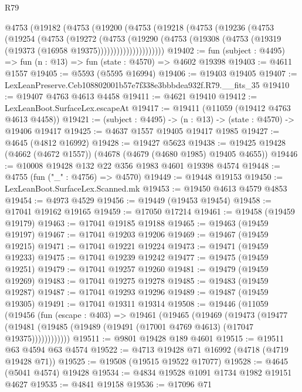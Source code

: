 \begin{lexlean}{R79}
\begin{coremodule}
      @4753
        (@19182
          (@4753
            (@19200
              (@4753
                (@19218
                  (@4753
                    (@19236
                      (@4753
                        (@19254
                          (@4753
                            (@19272
                              (@4753
                                (@19290
                                  (@4753
                                    (@19308
                                      (@4753 (@19319 (@19373 (@16958 @19375)))))))))))))))))))))
@19402 := fun (subject : @4495) => fun (n : @13) => fun (state : @4570) => @4602 @19398
@19403 := @4611 @1557
@19405 := @5593 (@5595 @16994)
@19406 := @19403 @19405
@19407 := LexLeanPreserve.Ceb108802001b57e7f338e3bbbdea932f.R79.__fits_35
@19410 := @19407 @4763 @4613 @4458
@19411 := @4621 @19410
@19412 := LexLeanBoot.SurfaceLex.escapeAt
@19417 := @19411 (@11059 (@19412 @4763 @4613 @4458))
@19421 := (subject : @4495) -> (n : @13) -> (state : @4570) -> @19406 @19417
@19425 := @4637 @1557 @19405 @19417 @1985
@19427 := @4645 (@4812 @16992)
@19428 := @19427 @5623
@19438 := @19425 @19428 (@4662 (@4672 @1557)) (@4678 (@4679 (@4680 @1985) @19405 @4655))
@19446 := @10008 @19428 @132 @22 @356 @1983 @4601 @19398 @4574
@19448 := @4755 (fun ("_" : @4756) => @4570)
@19449 := @19448 @19153
@19450 := LexLeanBoot.SurfaceLex.Scanned.mk
@19453 := @19450 @4613 @4579 @4853
@19454 := @4973 @4529
@19456 := @19449 (@19453 @19454)
@19458 := @17041 @19162 @19165
@19459 := @17050 @17214
@19461 := @19458 (@19459 @19179)
@19463 := @17041 @19185 @19188
@19465 := @19463 (@19459 @19197)
@19467 := @17041 @19203 @19206
@19469 := @19467 (@19459 @19215)
@19471 := @17041 @19221 @19224
@19473 := @19471 (@19459 @19233)
@19475 := @17041 @19239 @19242
@19477 := @19475 (@19459 @19251)
@19479 := @17041 @19257 @19260
@19481 := @19479 (@19459 @19269)
@19483 := @17041 @19275 @19278
@19485 := @19483 (@19459 @19287)
@19487 := @17041 @19293 @19296
@19489 := @19487 (@19459 @19305)
@19491 := @17041 @19311 @19314
@19508 := @19446
    (@11059
      (@19456
        (fun (escape : @403) =>
        @19461
          (@19465
            (@19469
              (@19473
                (@19477
                  (@19481 (@19485 (@19489 (@19491 (@17001 @4769 @4613) (@17047 @19375))))))))))))
@19511 := @9801 @19428 @189 @4601
@19515 := @19511 @63 @4594 @63 @4574
@19522 := @4713 @19428 @71 @16992 (@4718 (@4719 @19428 @71))
@19525 := @19508 (@19515 @19522 @17077)
@19528 := @4645 (@5041 @4574) @19428
@19534 := @4834 @19528 @1091 @1734 @1982 @19151 @4627
@19535 := @4841 @19158
@19536 := @17096 @71

\end{coremodule}
\end{lexlean}
